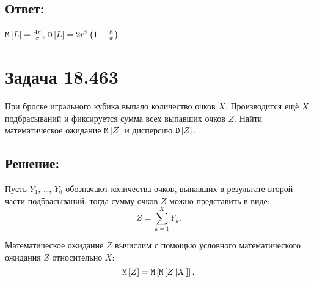 \subsection*{Ответ:}
$\mathtt{M} \left [ L \right ] = \frac{4 r}{\pi}$, $\mathtt{D} \left [ L \right ] = 2 r^2 \left ( 1 - \frac{8}{\pi} \right )$.

\section*{Задача 18.463}
При броске игрального кубика выпало количество очков $X$. Производится ещё $X$ подбрасываний и фиксируется сумма всех выпавших очков $Z$.
Найти математическое ожидание $\mathtt{M} \left [ Z \right ]$ и дисперсию $\mathtt{D} \left [ Z \right ]$.

\subsection*{Решение:}
Пусть $Y_1$, \dots, $Y_6$ обозначают количества очков, выпавших в результате второй части подбрасываний, тогда сумму очков $Z$ можно представить
в виде:
\begin{equation}
    Z
    = \sum_{k=1}^X Y_k .
\end{equation}

Математическое ожидание $Z$ вычислим с помощью условного математического ожидания $Z$ относительно $X$:
\begin{equation}
    \mathtt{M} \left [ Z \right ]
    = \mathtt{M} \left [ \mathtt{M} \left [ Z \left | X \right . \right ] \right ].
\end{equation}

